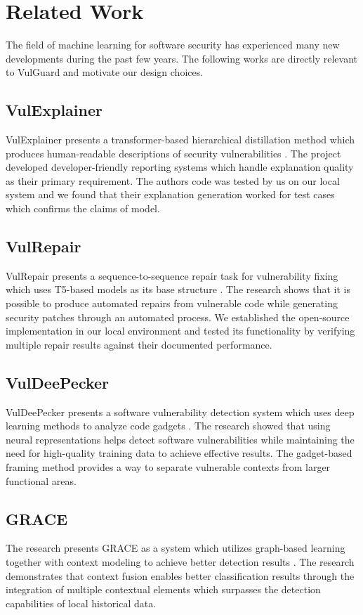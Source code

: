 \chapter{Related Work}
\label{ch:related-work}
The field of machine learning for software security has experienced many new developments during the past few years. The following works are directly relevant to VulGuard and motivate our design choices.

\section{VulExplainer}
VulExplainer presents a transformer-based hierarchical distillation method which produces human-readable descriptions of security vulnerabilities \cite{vulexplainer}. The project developed developer-friendly reporting systems which handle explanation quality as their primary requirement. The authors code was tested by us on our local system and we found that their explanation generation worked for test cases which confirms the claims of model.

\section{VulRepair}
VulRepair presents a sequence-to-sequence repair task for vulnerability fixing which uses T5-based models as its base structure \cite{vulrepair}. The research shows that it is possible to produce automated repairs from vulnerable code while generating security patches through an automated process. We established the open-source implementation in our local environment and tested its functionality by verifying multiple repair results against their documented performance.

\section{VulDeePecker}
VulDeePecker presents a software vulnerability detection system which uses deep learning methods to analyze code gadgets \cite{vuldeepecker}. The research showed that using neural representations helps detect software vulnerabilities while maintaining the need for high-quality training data to achieve effective results. The gadget-based framing method provides a way to separate vulnerable contexts from larger functional areas.

\section{GRACE}
The research presents GRACE as a system which utilizes graph-based learning together with context modeling to achieve better detection results \cite{grace}. The research demonstrates that context fusion enables better classification results through the integration of multiple contextual elements which surpasses the detection capabilities of local historical data. 

